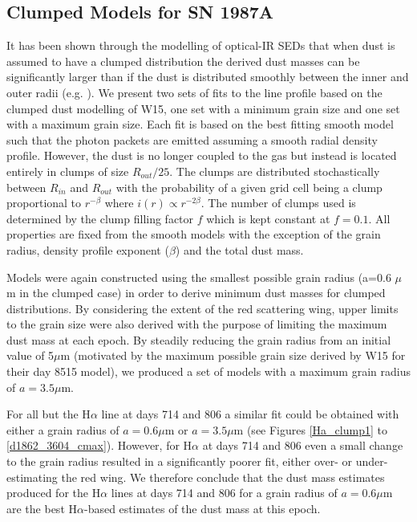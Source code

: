 \documentclass[useAMS,usenatbib,usegraphicx]{mnras}
\begin{document}
\subsection{Clumped Models for SN 1987A}
\label{clumped_models}


It has been shown through the modelling of optical-IR SEDs that when dust 
is assumed to have a clumped distribution the derived dust masses can be 
significantly larger than if the dust is distributed smoothly between the 
inner and outer radii (e.g. \citet{Owen2015}).  We present two sets of fits to the line profile based on 
the clumped dust modelling of W15, one set with a minimum grain size and one set with a maximum grain size.  Each fit is based on the best 
fitting smooth model such that the photon packets are emitted assuming a smooth 
radial density profile.  However, the dust is no longer coupled to the gas 
but instead is located entirely in clumps of size $R_{out}/25$.  The 
clumps are distributed stochastically between $R_{in}$ and $R_{out}$ with 
the probability of a given grid cell being a clump proportional to $r^{- 
\beta }$ where $i(r) \propto r^{-2 \beta}$.  The number of clumps used is 
determined by the clump filling factor $f$ which is kept constant at $f=0.1$.  All 
properties are fixed from the smooth models with the exception of the grain 
radius, density profile exponent ($\beta$) and the total dust mass.


Models were again constructed using the smallest possible grain radius (a=0.6 $\mu$m in the clumped case) in order to derive minimum dust masses for clumped distributions.  By considering the extent of the red scattering wing, upper limits to the grain size were also derived with the purpose of limiting the maximum  dust mass at each epoch.  By 
steadily reducing the grain radius from an initial value of 5$\mu$m 
(motivated by the maximum possible grain size derived by W15 for their day 
8515 model), we produced a set of models with a maximum grain radius of $a=3.5\mu$m.  

For all but the H$\alpha$ line at days 714 and 806 a similar fit could be obtained with either a grain radius of $a=0.6\mu$m or $a=3.5\mu$m (see Figures \ref{Ha_clump1} to 
\ref{d1862_3604_cmax}).  However, for H$\alpha$ at days 714 and 806  even a small change to the grain radius resulted in a significantly poorer fit, either 
over- or under-estimating the red wing. We therefore conclude that the dust mass estimates produced for the H$\alpha$ lines at days 714 and 
806 for a grain radius of $a=0.6\mu$m are the best H$\alpha$-based estimates of the dust mass 
at this epoch.   
\end{document}
